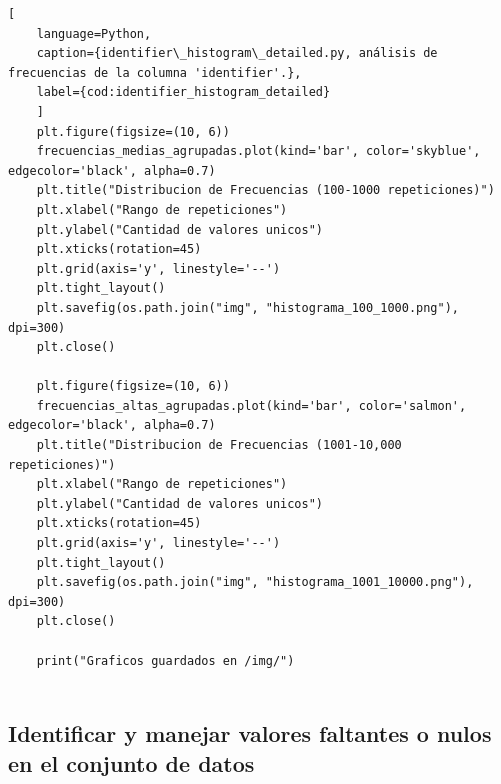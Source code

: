 \begin{lstlisting}[
    language=Python,
    caption={identifier\_histogram\_detailed.py, análisis de frecuencias de la columna 'identifier'.},
    label={cod:identifier_histogram_detailed}
    ]
    plt.figure(figsize=(10, 6))
    frecuencias_medias_agrupadas.plot(kind='bar', color='skyblue', edgecolor='black', alpha=0.7)
    plt.title("Distribucion de Frecuencias (100-1000 repeticiones)")
    plt.xlabel("Rango de repeticiones")
    plt.ylabel("Cantidad de valores unicos")
    plt.xticks(rotation=45)
    plt.grid(axis='y', linestyle='--')
    plt.tight_layout()
    plt.savefig(os.path.join("img", "histograma_100_1000.png"), dpi=300)
    plt.close()

    plt.figure(figsize=(10, 6))
    frecuencias_altas_agrupadas.plot(kind='bar', color='salmon', edgecolor='black', alpha=0.7)
    plt.title("Distribucion de Frecuencias (1001-10,000 repeticiones)")
    plt.xlabel("Rango de repeticiones")
    plt.ylabel("Cantidad de valores unicos")
    plt.xticks(rotation=45)
    plt.grid(axis='y', linestyle='--')
    plt.tight_layout()
    plt.savefig(os.path.join("img", "histograma_1001_10000.png"), dpi=300)
    plt.close()

    print("Graficos guardados en /img/")
    
\end{lstlisting}

\subsection{Identificar y manejar valores faltantes o nulos en el conjunto de datos}

